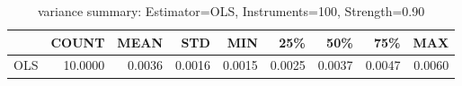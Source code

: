 \begin{table}[ht]
\centering
\caption{variance summary: Estimator=OLS, Instruments=100, Strength=0.90}
\begin{tabular}{lrrrrrrrr}
\toprule
 & COUNT & MEAN & STD & MIN & 25\% & 50\% & 75\% & MAX \\
\midrule
OLS & 10.0000 & 0.0036 & 0.0016 & 0.0015 & 0.0025 & 0.0037 & 0.0047 & 0.0060 \\
\bottomrule
\end{tabular}
\end{table}
